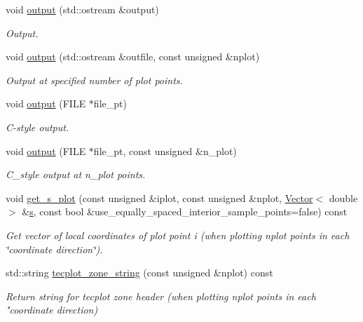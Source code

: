 \begin{DoxyCompactItemize}
void \hyperlink{classoomph_1_1TElement_3_012_00_01NNODE__1D_01_4_ad66ccbcca9ee2a4eb3c24bdd21c096f9}{output} (std\+::ostream \&output)
\begin{DoxyCompactList}\small\item\em Output. \end{DoxyCompactList}\item 
void \hyperlink{classoomph_1_1TElement_3_012_00_01NNODE__1D_01_4_a5e9bfd033563fd0da6e93b581991827f}{output} (std\+::ostream \&outfile, const unsigned \&nplot)
\begin{DoxyCompactList}\small\item\em Output at specified number of plot points. \end{DoxyCompactList}\item 
void \hyperlink{classoomph_1_1TElement_3_012_00_01NNODE__1D_01_4_acf3bfd1c5a6462aa9555bc8451914e63}{output} (F\+I\+LE $\ast$file\+\_\+pt)
\begin{DoxyCompactList}\small\item\em C-\/style output. \end{DoxyCompactList}\item 
void \hyperlink{classoomph_1_1TElement_3_012_00_01NNODE__1D_01_4_a9c5e3dba68906cb65e1f38eb0638080c}{output} (F\+I\+LE $\ast$file\+\_\+pt, const unsigned \&n\+\_\+plot)
\begin{DoxyCompactList}\small\item\em C\+\_\+style output at n\+\_\+plot points. \end{DoxyCompactList}\item 
void \hyperlink{classoomph_1_1TElement_3_012_00_01NNODE__1D_01_4_a9276c0c42a0e98f0e72719f510a83bc8}{get\+\_\+s\+\_\+plot} (const unsigned \&iplot, const unsigned \&nplot, \hyperlink{classoomph_1_1Vector}{Vector}$<$ double $>$ \&\hyperlink{cfortran_8h_ab7123126e4885ef647dd9c6e3807a21c}{s}, const bool \&use\+\_\+equally\+\_\+spaced\+\_\+interior\+\_\+sample\+\_\+points=false) const
\begin{DoxyCompactList}\small\item\em Get vector of local coordinates of plot point i (when plotting nplot points in each \char`\"{}coordinate direction\char`\"{}). \end{DoxyCompactList}\item 
std\+::string \hyperlink{classoomph_1_1TElement_3_012_00_01NNODE__1D_01_4_a4f779eb32a1a91ae566a8a87ae6bc242}{tecplot\+\_\+zone\+\_\+string} (const unsigned \&nplot) const
\begin{DoxyCompactList}\small\item\em Return string for tecplot zone header (when plotting nplot points in each "coordinate direction) \end{DoxyCompactList}\item 

\end{DoxyCompactItemize}
